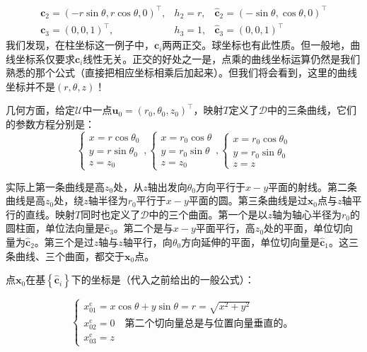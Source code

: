 \documentclass[main.tex]{subfiles}
\begin{document}
\begin{example}[柱坐标]
\begin{equation*}
\begin{array}{lll}
            \mathbf{c}_2=\left(-r\sin\theta,r\cos\theta,0\right)^\intercal, & h_2=r, & \mathbf{\hat{c}}_2=\left(-\sin\theta,\cos\theta,0\right)^\intercal \\
            \mathbf{c}_3=\left(0,0,1\right)^\intercal,                      & h_3=1, & \mathbf{\hat{c}}_3=\left(0,0,1\right)^\intercal
        \end{array}\end{equation*}
    我们发现，在柱坐标这一例子中，$\mathbf{c}_i$两两正交。球坐标也有此性质。但一般地，曲线坐标系仅要求$\mathbf{c}_i$线性无关。正交的好处之一是，点乘的曲线坐标运算仍然是我们熟悉的那个公式（直接把相应坐标相乘后加起来）。但我们将会看到，这里的曲线坐标并不是$\left(r,\theta,z\right)$！

    几何方面，给定$\mathcal{U}$中一点$\mathbf{u}_0=\left(r_0,\theta_0,z_0\right)^\intercal$，映射$T$定义了$\mathcal{D}$中的三条曲线，它们的参数方程分别是：
    \[
        \left\{\begin{array}{l}
            x=r\cos\theta_0 \\
            y=r\sin\theta_0 \\
            z=z_0\end{array}\right.,
        \left\{\begin{array}{l}
            x=r_0\cos\theta \\
            y=r_0\sin\theta \\
            z=z_0\end{array}\right.,
        \left\{\begin{array}{l}
            x=r_0\cos\theta_0 \\
            y=r_0\sin\theta_0 \\
            z=z\end{array}\right.\]

    实际上第一条曲线是高$z_0$处，从$z$轴出发向$\theta_0$方向平行于$x-y$平面的射线。第二条曲线是高$z_0$处，绕$z$轴半径为$r_0$平行于$x-y$平面的圆。第三条曲线是过$\mathbf{x}_0$点与$z$轴平行的直线。映射$T$同时也定义了$\mathcal{D}$中的三个曲面。第一个是以$z$轴为轴心半径为$r_0$的圆柱面，单位法向量是$\mathbf{\hat{c}}_3$。第二个是与$x-y$平面平行，高$z_0$处的平面，单位切向量为$\mathbf{\hat{c}}_2$。第三个是过$z$轴与$z$轴平行，向$\theta_0$方向延伸的平面，单位切向量是$\mathbf{\hat{c}}_1$。这三条曲线、三个曲面，都交于$\mathbf{x}_0$点。

    点$\mathbf{x}_0$在基$\left\{\mathbf{\hat{c}}_i\right\}$下的坐标是（代入之前给出的一般公式）：

    \[
        \left\{\begin{array}{l}
            x_{01}^\mathrm{c}=x\cos\theta+y\sin\theta=r=\sqrt{x^2+y^2} \\
            x_{02}^\mathrm{c}=0\quad\text{第二个切向量总是与位置向量垂直的。}           \\
            x_{03}^\mathrm{c}=z\end{array}\right.
    \]


\end{example}
\end{document}
